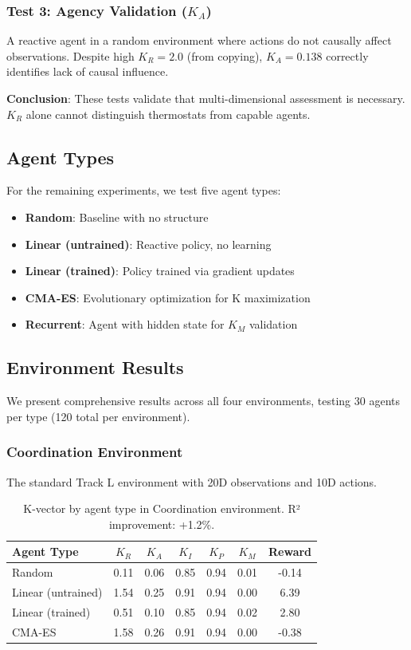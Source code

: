 \documentclass[11pt,a4paper]{article}
\newcommand{\kr}{K_R}
\newcommand{\ka}{K_A}
\newcommand{\ki}{K_I}
\newcommand{\kp}{K_P}
\newcommand{\km}{K_M}
\begin{document}
\subsubsection{Test 3: Agency Validation ($K_A$)}

A reactive agent in a random environment where actions do not causally affect observations. Despite high $K_R = 2.0$ (from copying), $K_A = 0.138$ correctly identifies lack of causal influence.

\textbf{Conclusion}: These tests validate that multi-dimensional assessment is necessary. $K_R$ alone cannot distinguish thermostats from capable agents.

\subsection{Agent Types}

For the remaining experiments, we test five agent types:
\begin{itemize}
    \item \textbf{Random}: Baseline with no structure
    \item \textbf{Linear (untrained)}: Reactive policy, no learning
    \item \textbf{Linear (trained)}: Policy trained via gradient updates
    \item \textbf{CMA-ES}: Evolutionary optimization for K maximization
    \item \textbf{Recurrent}: Agent with hidden state for $\km$ validation
\end{itemize}

\subsection{Environment Results}

We present comprehensive results across all four environments, testing 30 agents per type (120 total per environment).

\subsubsection{Coordination Environment}

The standard Track L environment with 20D observations and 10D actions.

\begin{table}[h]
\centering
\begin{tabular}{lcccccc}
\toprule
\textbf{Agent Type} & $\kr$ & $\ka$ & $\ki$ & $\kp$ & $\km$ & \textbf{Reward} \\
\midrule
Random & 0.11 & 0.06 & 0.85 & 0.94 & 0.01 & -0.14 \\
Linear (untrained) & 1.54 & 0.25 & 0.91 & 0.94 & 0.00 & 6.39 \\
Linear (trained) & 0.51 & 0.10 & 0.85 & 0.94 & 0.02 & 2.80 \\
CMA-ES & 1.58 & 0.26 & 0.91 & 0.94 & 0.00 & -0.38 \\
\bottomrule
\end{tabular}
\caption{K-vector by agent type in Coordination environment. R² improvement: +1.2\%.}
\label{tab:coordination-results}
\end{table}
\end{document}
